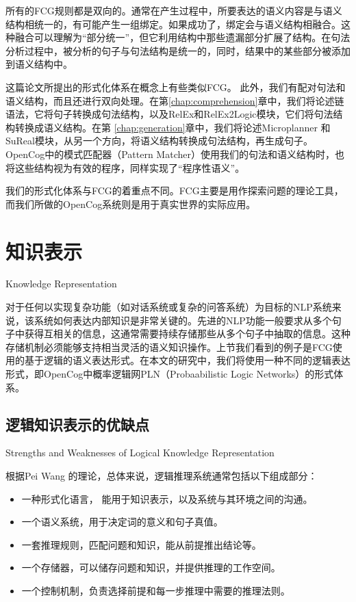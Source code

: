所有的FCG规则都是双向的。通常在产生过程中，所要表达的语义内容是与语义结构相统一的，有可能产生一组绑定。如果成功了，绑定会与语义结构相融合。这种融合可以理解为“部分统一”，但它利用结构中那些遗漏部分扩展了结构。在句法分析过程中，被分析的句子与句法结构是统一的，同时，结果中的某些部分被添加到语义结构中。


这篇论文所提出的形式化体系在概念上有些类似FCG。 此外，我们有配对句法和语义结构，而且还进行双向处理。在第\ref{chap:comprehension}章中，我们将论述链语法，它将句子转换成句法结构，以及RelEx和RelEx2Logic模块，它们将句法结构转换成语义结构。在第 \ref{chap:generation}章中，我们将论述Microplanner 和SuReal模块，从另一个方向，将语义结构转换成句法结构，再生成句子。OpenCog中的模式匹配器（Pattern Matcher）使用我们的句法和语义结构时，也将这些结构视为有效的程序，同样实现了“程序性语义”。

我们的形式化体系与FCG的着重点不同。FCG主要是用作探索问题的理论工具，而我们所做的OpenCog系统则是用于真实世界的实际应用。

\section{知识表示}{Knowledge Representation}

对于任何以实现复杂功能（如对话系统或复杂的问答系统）为目标的NLP系统来说，该系统如何表达内部知识是非常关键的。先进的NLP功能一般要求从多个句子中获得互相关的信息，这通常需要持续存储那些从多个句子中抽取的信息。这种存储机制必须能够支持相当灵活的语义知识操作。上节我们看到的例子是FCG使用的基于逻辑的语义表达形式。在本文的研究中，我们将使用一种不同的逻辑表达形式，即OpenCog中概率逻辑网PLN（Probaabilistic Logic Networks）的形式体系。

\subsection{逻辑知识表示的优缺点}{Strengths and Weaknesses of Logical Knowledge Representation}

根据Pei Wang \cite{Wang2006}的理论，总体来说，逻辑推理系统通常包括以下组成部分：

\begin{itemize}
\item 一种形式化语言， 能用于知识表示，以及系统与其环境之间的沟通。
\item 一个语义系统，用于决定词的意义和句子真值。
\item 一套推理规则，匹配问题和知识，能从前提推出结论等。
\item 一个存储器，可以储存问题和知识，并提供推理的工作空间。
\item 一个控制机制，负责选择前提和每一步推理中需要的推理法则。
\end{itemize}

